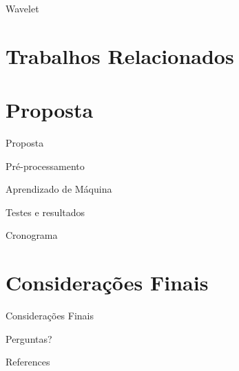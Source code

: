 \documentclass[10pt]{beamer}
\begin{document}
\begin{frame}{Wavelet}
    
\end{frame}

\section{Trabalhos Relacionados}

\section{Proposta}

\begin{frame}{Proposta}
    
\end{frame}

\begin{frame}{Pré-processamento}
    
\end{frame}

\begin{frame}{Aprendizado de Máquina}
    
\end{frame}

\begin{frame}{Testes e resultados}
    
\end{frame}

\begin{frame}{Cronograma}
    
\end{frame}

\section{Considerações Finais}

\begin{frame}{Considerações Finais}
    
\end{frame}

{
\begin{frame}[standout]
  Perguntas?
\end{frame}
}

\appendix


\begin{frame}[allowframebreaks]{References}

  
  

\end{frame}
\end{document}
